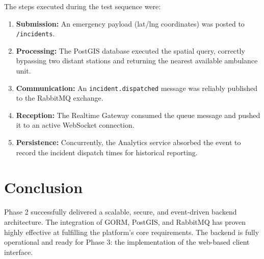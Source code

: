 \documentclass[12pt,a4paper]{report}
\begin{document}
The steps executed during the test sequence were:
\begin{enumerate}
	\item \textbf{Submission:} An emergency payload (lat/lng coordinates) was posted to \texttt{/incidents}.
	\item \textbf{Processing:} The PostGIS database executed the spatial query, correctly bypassing two distant stations and returning the nearest available ambulance unit.
	\item \textbf{Communication:} An \texttt{incident.dispatched} message was reliably published to the RabbitMQ exchange.
	\item \textbf{Reception:} The Realtime Gateway consumed the queue message and pushed it to an active WebSocket connection.
	\item \textbf{Persistence:} Concurrently, the Analytics service absorbed the event to record the incident dispatch times for historical reporting.
\end{enumerate}

\section{Conclusion}

Phase 2 successfully delivered a scalable, secure, and event-driven backend architecture. The integration of GORM, PostGIS, and RabbitMQ has proven highly effective at fulfilling the platform's core requirements. The backend is fully operational and ready for Phase 3: the implementation of the web-based client interface.
\end{document}
